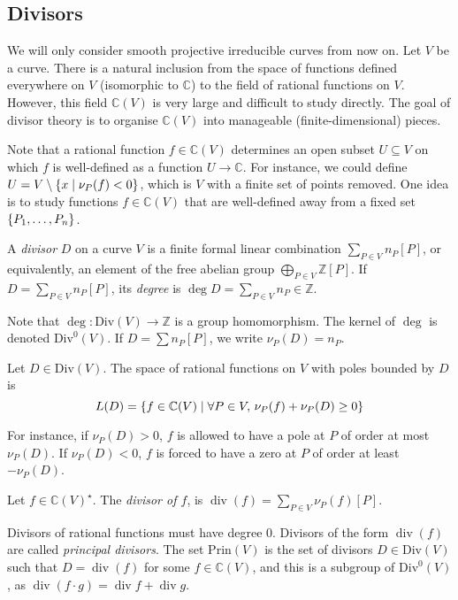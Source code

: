 \subsection{Divisors}
We will only consider smooth projective irreducible curves from now on.
Let \( V \) be a curve.
There is a natural inclusion from the space of functions defined everywhere on \( V \) (isomorphic to \( \mathbb C \)) to the field of rational functions on \( V \).
However, this field \( \mathbb C(V) \) is very large and difficult to study directly.
The goal of divisor theory is to organise \( \mathbb C(V) \) into manageable (finite-dimensional) pieces.

Note that a rational function \( f \in \mathbb C(V) \) determines an open subset \( U \subseteq V \) on which \( f \) is well-defined as a function \( U \to \mathbb C \).
For instance, we could define \( U = V \setminus \qty{x \mid \nu_P(f) < 0} \), which is \( V \) with a finite set of points removed.
One idea is to study functions \( f \in \mathbb C(V) \) that are well-defined away from a fixed set \( \qty{P_1, \dots, P_n} \).
\begin{definition}
    A \emph{divisor} \( D \) on a curve \( V \) is a finite formal linear combination \( \sum_{P \in V} n_P[P] \), or equivalently, an element of the free abelian group \( \bigoplus_{P \in V} \mathbb Z[P] \).
    If \( D = \sum_{P \in V} n_P [P] \), its \emph{degree} is \( \deg D = \sum_{P \in V} n_P \in \mathbb Z \).
\end{definition}
Note that \( \deg \colon \mathrm{Div}(V) \to \mathbb Z \) is a group homomorphism.
The kernel of \( \deg \) is denoted \( \mathrm{Div}^0(V) \).
If \( D = \sum n_P [P] \), we write \( \nu_P(D) = n_P \).
\begin{definition}
    Let \( D \in \mathrm{Div}(V) \).
    The space of rational functions on \( V \) with poles bounded by \( D \) is
    \[ L(D) = \qty{f \in \mathbb C(V) \mid \forall P \in V,\, \nu_P(f) + \nu_P(D) \geq 0} \]
\end{definition}
For instance, if \( \nu_P(D) > 0 \), \( f \) is allowed to have a pole at \( P \) of order at most \( \nu_P(D) \).
If \( \nu_P(D) < 0 \), \( f \) is forced to have a zero at \( P \) of order at least \( -\nu_P(D) \).
\begin{definition}
    Let \( f \in \mathbb C(V)^\star \).
    The \emph{divisor of \( f \)}, is \( \operatorname{div}(f) = \sum_{P \in V} \nu_P(f)[P] \).
\end{definition}
Divisors of rational functions must have degree 0.
Divisors of the form \( \operatorname{div}(f) \) are called \emph{principal divisors}.
The set \( \mathrm{Prin}(V) \) is the set of divisors \( D \in \mathrm{Div}(V) \) such that \( D = \operatorname{div}(f) \) for some \( f \in \mathbb C(V) \), and this is a subgroup of \( \mathrm{Div}^0(V) \), as \( \operatorname{div}(f \cdot g) = \operatorname{div}f + \operatorname{div}g \).


